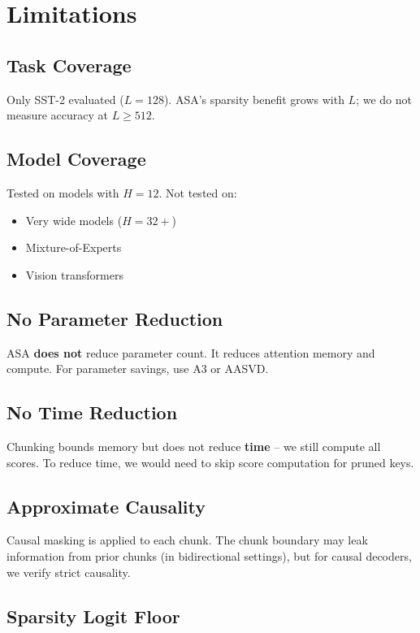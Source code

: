 
\section{Limitations}

\subsection{Task Coverage}

Only SST-2 evaluated ($L = 128$). ASA's sparsity benefit grows with $L$; 
we do not measure accuracy at $L \ge 512$.

\subsection{Model Coverage}

Tested on models with $H = 12$. Not tested on:
\begin{itemize}
\item Very wide models ($H = 32+$)
\item Mixture-of-Experts
\item Vision transformers

\end{itemize}
\subsection{No Parameter Reduction}

ASA \textbf{does not} reduce parameter count. It reduces attention memory and 
compute. For parameter savings, use A3 or AASVD.

\subsection{No Time Reduction}

Chunking bounds memory but does not reduce \textbf{time} -- we still compute all 
scores. To reduce time, we would need to skip score computation for pruned 
keys.

\subsection{Approximate Causality}

Causal masking is applied to each chunk. The chunk boundary may leak 
information from prior chunks (in bidirectional settings), but for causal 
decoders, we verify strict causality.

\subsection{Sparsity Logit Floor}

